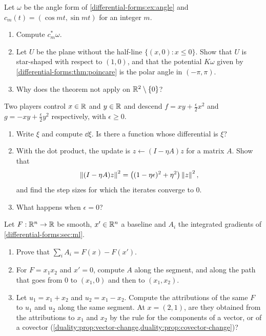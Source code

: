 \begin{notechapter}
\begin{exercise}\label{differential-forms:exr:8}
Let $\omega$ be the angle form of \cref{differential-forms:ex:angle}
and $c_m(t) = (\cos mt, \sin mt)$ for an integer $m$.
\begin{enumerate}[nosep]
  \item Compute $c_m^*\omega$.
  \item Let $U$ be the plane without the half-line
        $\{(x, 0) : x\leq0\}$. Show that $U$ is star-shaped with
        respect to $(1, 0)$, and that the potential $K\omega$ given by
        \cref{differential-forms:thm:poincare} is the polar angle in
        $(-\pi, \pi)$.
  \item Why does the theorem not apply on $\mathbb{R}^2\setminus\{0\}$?
\end{enumerate}
\end{exercise}

\begin{exercise}\label{differential-forms:exr:9}
Two players control $x\in\mathbb{R}$ and $y\in\mathbb{R}$ and descend
$f = xy + \frac\epsilon2x^2$ and $g = -xy + \frac\epsilon2y^2$
respectively, with $\epsilon\geq0$.
\begin{enumerate}[nosep]
  \item Write $\xi$ and compute $\dd\xi$. Is there a function whose
        differential is $\xi$?
  \item With the dot product, the update is $z\leftarrow(I - \eta A)z$
        for a matrix $A$. Show that
        \[
          \left\|(I - \eta A)z\right\|^2
          = \bigl((1 - \eta\epsilon)^2 + \eta^2\bigr)\left\|z\right\|^2 ,
        \]
        and find the step sizes for which the iterates converge to $0$.
  \item What happens when $\epsilon = 0$?
\end{enumerate}
\end{exercise}

\begin{exercise}\label{differential-forms:exr:10}
Let $F:\mathbb{R}^n\to\mathbb{R}$ be smooth, $x'\in\mathbb{R}^n$ a baseline and $A_i$ the
integrated gradients of \cref{differential-forms:sec:ml}.
\begin{enumerate}[nosep]
  \item Prove that $\sum_iA_i = F(x) - F(x')$.
  \item For $F = x_1x_2$ and $x' = 0$, compute $A$ along the segment,
        and along the path that goes from $0$ to $(x_1, 0)$ and then to
        $(x_1, x_2)$.
  \item Let $u_1 = x_1 + x_2$ and $u_2 = x_1 - x_2$. Compute the
        attributions of the same $F$ to $u_1$ and $u_2$ along the same
        segment. At $x = (2, 1)$, are they obtained from the
        attributions to $x_1$ and $x_2$ by the rule for the components
        of a vector, or of a covector
        (\cref{duality:prop:vector-change,duality:prop:covector-change})?
\end{enumerate}
\end{exercise}
\end{notechapter}
